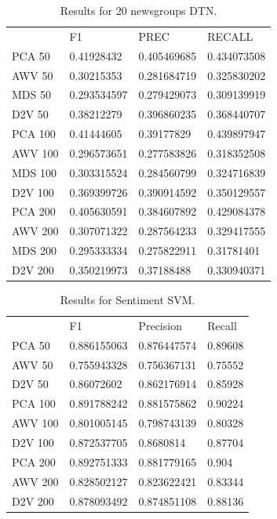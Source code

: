 \begin{table}[]
	\begin{tabular}{llll}
		& F1          & PREC        & RECALL      \\
		PCA 50  & 0.41928432  & 0.405469685 & 0.434073508 \\
		AWV 50  & 0.30215353  & 0.281684719 & 0.325830202 \\
		MDS 50  & 0.293534597 & 0.279429073 & 0.309139919 \\
		D2V 50  & 0.38212279  & 0.396860235 & 0.368440707 \\
		PCA 100 & 0.41444605  & 0.39177829  & 0.439897947 \\
		AWV 100 & 0.296573651 & 0.277583826 & 0.318352508 \\
		MDS 100 & 0.303315524 & 0.284560799 & 0.324716839 \\
		D2V 100 & 0.369399726 & 0.390914592 & 0.350129557 \\
		PCA 200 & 0.405630591 & 0.384607892 & 0.429084378 \\
		AWV 200 & 0.307071322 & 0.287564233 & 0.329417555 \\
		MDS 200 & 0.295333334 & 0.275822911 & 0.31781401  \\
		D2V 200 & 0.350219973 & 0.37188488  & 0.330940371
	\end{tabular}
	\caption{Results for 20 newsgroups DTN.}
	\label{table:Newsgroups}
\end{table}

\begin{table}[]
	\begin{tabular}{llll}
		& F1          & Precision   & Recall  \\
		PCA 50  & 0.886155063 & 0.876447574 & 0.89608 \\
		AWV 50  & 0.755943328 & 0.756367131 & 0.75552 \\
		D2V 50  & 0.86072602  & 0.862176914 & 0.85928 \\
		PCA 100 & 0.891788242 & 0.881575862 & 0.90224 \\
		AWV 100 & 0.801005145 & 0.798743139 & 0.80328 \\
		D2V 100 & 0.872537705 & 0.8680814   & 0.87704 \\
		PCA 200 & 0.892751333 & 0.881779165 & 0.904   \\
		AWV 200 & 0.828502127 & 0.823622421 & 0.83344 \\
		D2V 200 & 0.878093492 & 0.874851108 & 0.88136
	\end{tabular}
	\caption{Results for Sentiment SVM.}
	\label{table:Newsgroups}
\end{table}

